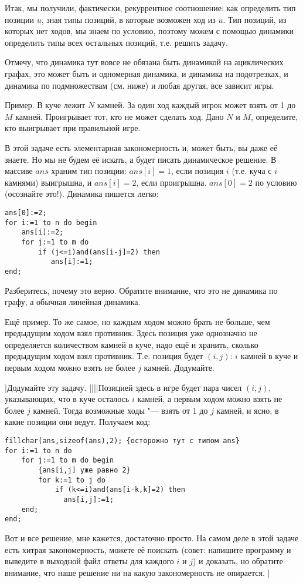 Итак, мы получили, фактически, рекуррентное соотношение: как определить тип
позиции $u$, зная типы позиций, в которые возможен ход из $u$.
Тип позиций, из которых нет ходов, мы знаем по условию, поэтому можем с помощью динамики определить типы всех остальных позиций,
т.е. решить задачу. 

Отмечу, что динамика тут вовсе не обязана быть динамикой на ациклических графах, это может быть и одномерная динамика,
и динамика на подотрезках, и динамика по подмножествам (см. ниже) и любая другая, все зависит игры.

Пример. В куче лежит $N$ камней. За один ход каждый игрок может взять от 1 до $M$ камней. Проигрывает тот, кто не может сделать ход.
Дано $N$ и $M$, определите, кто выигрывает при правильной игре.

В этой задаче есть элементарная закономерность и, может быть, вы даже её знаете. Но мы не будем её искать, а будет писать 
динамическое решение. В массиве $ans$ храним тип позиции: $ans[i]=1$, если позиция $i$ (т.е. куча с $i$ камнями)
выигрышна, и $ans[i]=2$, если проигрышна. $ans[0]=2$ по условию (осознайте это!). Динамика пишется легко:
\begin{codesampleo}\begin{verbatim}
ans[0]:=2;
for i:=1 to n do begin
    ans[i]:=2;
    for j:=1 to m do
        if (j<=i)and(ans[i-j]=2) then
           ans[i]:=1;
end;
\end{verbatim}\end{codesampleo}
Разберитесь, почему это верно. Обратите внимание, что это не динамика по графу, а обычная линейная динамика.

Ещё пример. То же самое, но каждым ходом можно брать не больше, чем предыдущим ходом взял противник. Здесь позиция уже 
однозначно не определяется количеством камней в куче, надо ещё и хранить, сколько предыдущим ходом взял противник.
Т.е. позиция будет $(i,j)$: $i$ камней в куче и первым ходом можно взять не более $j$ камней. Додумайте.

\task|Додумайте эту задачу.
||||Позицией здесь в игре будет пара чисел $(i,j)$, указывающих, что в куче осталось $i$ камней, а первым ходом можно взять не более $j$ камней. Тогда возможные ходы "--- взять от 1 до $j$ камней, и ясно, в какие позиции они ведут. Получаем код:
\begin{codesampleo}\begin{verbatim}
fillchar(ans,sizeof(ans),2); {осторожно тут с типом ans}
for i:=1 to n do 
    for j:=1 to m do begin
        {ans[i,j] уже равно 2}
        for k:=1 to j do
            if (k<=i)and(ans[i-k,k]=2) then
              ans[i,j]:=1;
    end;
end;
\end{verbatim}\end{codesampleo}
Вот и все решение, мне кажется, достаточно просто. На самом деле в этой задаче есть хитрая закономерность, можете её поискать (совет: напишите программу и выведите в выходной файл ответы для каждого $i$ и $j$) и доказать, но обратите внимание, что наше решение ни на какую закономерность не опирается.
|

